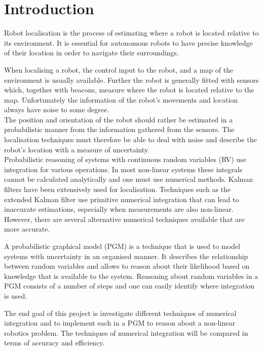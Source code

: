 \documentclass[12pt,oneside,openany,a4paper, %
afrikaans,english,
]{memoir}
\numberwithin{equation}{chapter}
\begin{document}
\mainmatter
\chapter{Introduction}
Robot localisation is the process of estimating where a robot is located relative to its environment. It is essential for autonomous robots to have precise knowledge of their location in order to navigate their surroundings.

When localising a robot, the control input to the robot, and a map of the environment is usually available. Further the robot is generally fitted with sensors which, together with beacons, measure where the robot is located relative to the map. Unfortunately the information of the robot's movements and location always have noise to some degree.\\
The position and orientation of the robot should rather be estimated in a probabilistic manner from the information gathered from the sensors. The localisation techniques must therefore be able to deal with noise and describe the robot's location with a measure of uncertainty.\\
Probabilistic reasoning of systems with continuous random variables (RV) use integration for various operations. In most non-linear systems these integrals cannot be calculated analytically and one must use numerical methods. Kalman filters have been extensively used for localisation. Techniques such as the extended Kalman filter use primitive numerical integration that can lead to inaccurate estimations, especially when measurements are also non-linear. However, there are several alternative numerical techniques available that are more accurate.

A probabilistic graphical model (PGM) is a technique that is used to model systems with uncertainty in an organised manner. It describes the relationship between random variables and allows to reason about their likelihood based on knowledge that is available to the system. Reasoning about random variables in a PGM consists of a number of steps and one can easily identify where integration is used.

The end goal of this project is investigate different techniques of numerical integration and to implement each in a PGM to reason about a non-linear robotics problem. The techniques of numerical integration will be compared in terms of accuracy and efficiency.
\setcounter{secnumdepth}{2}
\end{document}
